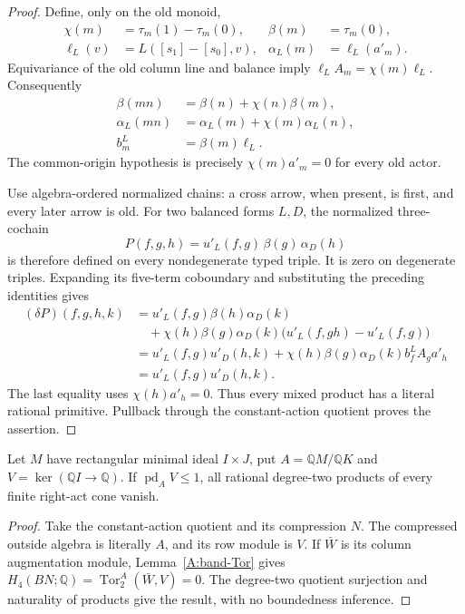 \begin{proof}
Define, only on the old monoid,
\[
\begin{aligned}
 \chi(m)&=\tau_m(1)-\tau_m(0),&
 \beta(m)&=\tau_m(0),\\
 \ell_L(v)&=L([s_1]-[s_0],v),&
 \alpha_L(m)&=\ell_L(a'_m).
\end{aligned}
\]
Equivariance of the old column line and balance imply
$\ell_LA_m=\chi(m)\ell_L$. Consequently
\[
\begin{aligned}
 \beta(mn)&=\beta(n)+\chi(n)\beta(m),\\
 \alpha_L(mn)&=\alpha_L(m)+\chi(m)\alpha_L(n),\\
 b_m^L&=\beta(m)\ell_L.
\end{aligned}
\]
The common-origin hypothesis is precisely
$\chi(m)a'_m=0$ for every old actor.

Use algebra-ordered normalized chains: a cross arrow,
when present, is first, and every later arrow is old.
For two balanced forms $L,D$, the normalized three-cochain
\[
 P(f,g,h)=u'_L(f,g)\,\beta(g)\,\alpha_D(h)
\]
is therefore defined on every nondegenerate typed triple.
It is zero on degenerate triples. Expanding its five-term
coboundary and substituting the preceding identities gives
\begin{align*}
 (\delta P)(f,g,h,k)
 &=u'_L(f,g)\beta(h)\alpha_D(k)\\
 &\quad+\chi(h)\beta(g)\alpha_D(k)
       \bigl(u'_L(f,gh)-u'_L(f,g)\bigr)\\
 &=u'_L(f,g)u'_D(h,k)
   +\chi(h)\beta(g)\alpha_D(k)b_f^LA_ga'_h\\
 &=u'_L(f,g)u'_D(h,k).
\end{align*}
The last equality uses $\chi(h)a'_h=0$. Thus every
mixed product has a literal rational primitive. Pullback
through the constant-action quotient proves the assertion.
\end{proof}

\begin{lemma}
\label{CP2:A-act-row-pd-one}
Let $M$ have rectangular minimal ideal $I\times J$, put
$A=\mathbb QM/\mathbb QK$ and
$V=\ker(\mathbb QI\to\mathbb Q)$.
If $\operatorname{pd}_A V\leq1$, all rational degree-two
products of every finite right-act cone vanish.
\end{lemma}
\begin{proof}
Take the constant-action quotient and its compression $N$.
The compressed outside algebra is literally $A$, and
its row module is $V$. If $\bar W$ is its column
augmentation module, Lemma~\ref{A:band-Tor} gives
$H_4(BN;\mathbb Q)=\operatorname{Tor}_2^A(\bar W,V)=0$.
The degree-two quotient surjection and naturality of
products give the result, with no boundedness inference.
\end{proof}

